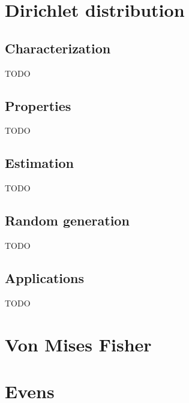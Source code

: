 \section{Dirichlet distribution}
\subsection{Characterization}
TODO
\subsection{Properties}
TODO
\subsection{Estimation}
TODO
\subsection{Random generation}
TODO
\subsection{Applications}
TODO

\section{Von Mises Fisher}
\section{Evens}